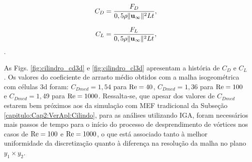 \documentclass[tese_patricia]{subfiles}
\begin{document}
\begin{align}
	C_D = \frac{F_D}{0,5\rho \lVert \mathbf{u}_{\infty} \lVert^{2} L t},
\end{align}

\begin{align}
	C_L = \frac{F_L}{0,5\rho \lVert \mathbf{u}_{\infty} \lVert^{2} L t},
\end{align}.


As Figs. \ref{fig:cilindro_cd3d} e \ref{fig:cilindro_cl3d} apresentam a história de $C_{D}$ e $C_{L}$. Os valores do coeficiente de arrasto médio obtidos com a malha isogeométrica com células 3d foram: $C_{Dmed} = 1,54$ para $\mathrm{Re} = 40$, $C_{Dmed} = 1,36$ para $\mathrm{Re} = 100$ e $C_{Dmed} = 1,49$ para $\mathrm{Re} = 1000$. Ressalta-se, que apesar dos valores de $C_{Dmed}$ estarem bem próximos aos da simulação com MEF tradicional da Subseção \ref{capitulo:Cap2:VerApl:Cilindo}, para as análises utilizando IGA, foram necessários mais passos de tempo para o início do processo de desprendimento de vórtices nos casos de $\mathrm{Re} = 100$ e $\mathrm{Re} = 1000$, o que está associado tanto à melhor uniformidade da discretização quanto à diferença na resolução da malha no plano $y_1\times y_2$. 
\end{document}

